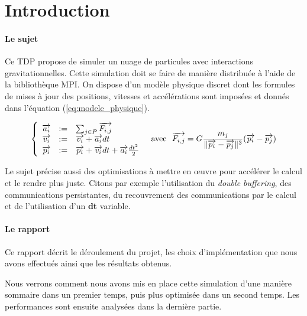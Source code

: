 \section*{Introduction}

\paragraph{Le sujet}
Ce TDP propose de simuler un nuage de particules avec interactions gravitationnelles. Cette simulation doit se faire de manière distribuée à l'aide de la bibliothèque MPI. On dispose d'un modèle physique discret dont les formules de mises à jour des positions, vitesses et accélérations sont imposées et donnés dans l'équation (\ref{eq:modele_physique}).

\begin{equation}
\left \{
   \begin{array}{r c l}
      \overrightarrow{a_i} & := & \sum_{j \in P}{\overrightarrow{F_{i,j}}} \\
      \overrightarrow{v_i} & := & \overrightarrow{v_i} + \overrightarrow{a_i} dt\\
      
      \overrightarrow{p_i} & := & \overrightarrow{p_i} + \overrightarrow{v_i} dt + \overrightarrow{a_i} \frac{dt^2}{2}\\
   \end{array}
\right.
   \text{~ avec ~}
   \overrightarrow{F_{i,j}} =  G\frac{m_j}{\|\overrightarrow{p_i}-\overrightarrow{p_j}\|^3}(\overrightarrow{p_i}-\overrightarrow{p_j})
\label{eq:modele_physique}
\end{equation}

Le sujet précise aussi des optimisations à mettre en \oe uvre pour accélérer le calcul et le rendre plus juste. Citons par exemple l'utilisation du \emph{double buffering}, des communications persistantes, du recouvrement des communications par le calcul et de l'utilisation d'un \textbf{dt} variable.

\paragraph{Le rapport}
Ce rapport décrit le déroulement du projet, les choix d'implémentation que nous avons effectués ainsi que les résultats obtenus.

Nous verrons comment nous avons mis en place cette simulation d'une manière sommaire dans un premier temps, puis plus optimisée dans un second temps. Les performances sont ensuite analysées dans la dernière partie.